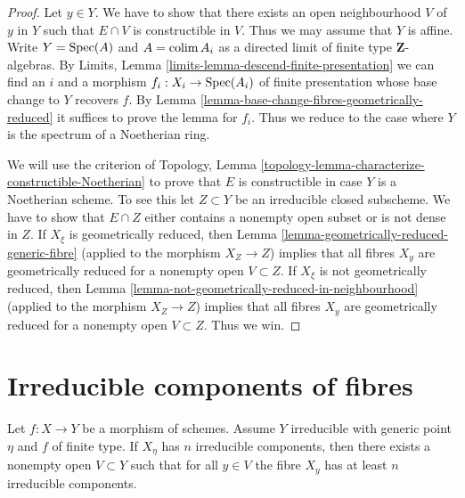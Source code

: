 \begin{proof}
Let $y \in Y$. We have to show that there exists an open neighbourhood
$V$ of $y$ in $Y$ such that $E \cap V$ is constructible in $V$. Thus we may
assume that $Y$ is affine. Write $Y = \mathop{\rm Spec}(A)$ and
$A = \mathop{\rm colim}\nolimits A_i$ as a directed limit of finite type
$\mathbf{Z}$-algebras. By
Limits, Lemma \ref{limits-lemma-descend-finite-presentation}
we can find an $i$ and a morphism $f_i : X_i \to \mathop{\rm Spec}(A_i)$ of
finite presentation whose base change to $Y$ recovers $f$. By
Lemma \ref{lemma-base-change-fibres-geometrically-reduced}
it suffices to prove the lemma for $f_i$. Thus we reduce to
the case where $Y$ is the spectrum of a Noetherian ring.

\medskip\noindent
We will use the criterion of
Topology, Lemma \ref{topology-lemma-characterize-constructible-Noetherian}
to prove that $E$ is constructible in case $Y$ is a Noetherian scheme.
To see this let $Z \subset Y$ be an irreducible closed subscheme.
We have to show that $E \cap Z$ either contains a nonempty open subset
or is not dense in $Z$. If $X_\xi$ is geometrically reduced, then
Lemma \ref{lemma-geometrically-reduced-generic-fibre}
(applied to the morphism $X_Z \to Z$)
implies that all fibres $X_y$ are geometrically reduced
for a nonempty open $V \subset Z$.
If $X_\xi$ is not geometrically reduced, then
Lemma \ref{lemma-not-geometrically-reduced-in-neighbourhood}
(applied to the morphism $X_Z \to Z$)
implies that all fibres $X_y$ are geometrically reduced
for a nonempty open $V \subset Z$. Thus we win.
\end{proof}








\section{Irreducible components of fibres}
\label{section-irreducible}

\begin{lemma}
\label{lemma-irreducible-components-in-neighbourhood}
Let $f : X \to Y$ be a morphism of schemes. Assume $Y$ irreducible with
generic point $\eta$ and $f$ of finite type. If $X_\eta$ has $n$
irreducible components, then there exists a nonempty open $V \subset Y$
such that for all $y \in V$ the fibre $X_y$ has at least $n$
irreducible components.
\end{lemma}


